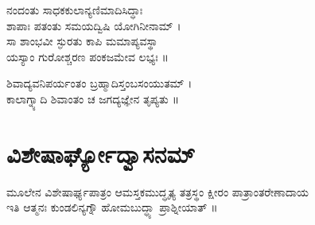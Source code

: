 ನಂದಂತು ಸಾಧಕಕುಲಾನ್ಯಣಿಮಾದಿಸಿದ್ಧಾಃ\\
ಶಾಪಾಃ ಪತಂತು ಸಮಯದ್ವಿಷಿ ಯೋಗಿನೀನಾಮ್ ।\\
ಸಾ ಶಾಂಭವೀ ಸ್ಫುರತು ಕಾಪಿ ಮಮಾಪ್ಯವಸ್ಥಾ\\
ಯಸ್ಯಾಂ ಗುರೋಶ್ಚರಣ ಪಂಕಜಮೇವ ಲಭ್ಯಃ ॥

ಶಿವಾದ್ಯವನಿಪರ್ಯಂತಂ ಬ್ರಹ್ಮಾದಿಸ್ತಂಬಸಂಯುತಮ್ ।\\
ಕಾಲಾಗ್ನ್ಯಾದಿ ಶಿವಾಂತಂ ಚ ಜಗದ್ಯಜ್ಞೇನ ತೃಪ್ಯತು ॥
\section{ವಿಶೇಷಾರ್ಘ್ಯೋದ್ವಾಸನಮ್}
ಮೂಲೇನ ವಿಶೇಷಾರ್ಘ್ಯಪಾತ್ರಂ ಆಮಸ್ತಕಮುದ್ಧೃತ್ಯ ತತ್ರಸ್ಥಂ ಕ್ಷೀರಂ ಪಾತ್ರಾಂತರೇಣಾದಾಯ \\
 ಇತಿ ಆತ್ಮನಃ ಕುಂಡಲಿನ್ಯಗ್ನೌ ಹೋಮಬುದ್ಧ್ಯಾ  ಪ್ರಾಶ್ನೀಯಾತ್ ॥

